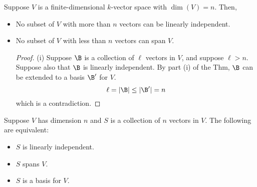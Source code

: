 \documentclass[a5paper]{article}
\begin{document}
\begin{corollary}
Suppose $V$ is a finite-dimensional $k$-vector space with $\dim(V)=n$. Then, 
\begin{itemize}
	\item No subset of $V$ with more than $n$ vectors can be linearly independent. 
	\item No subset of $V$ with less than $n$ vectors can span $V$. 
	\begin{proof}(i)
	Suppose $\B$ is a collection of $\ell$ vectors in $V$, and suppose $\ell>n$. Suppose also that $\B$ is linearly independent. By part (i) of the Thm, $\B$ can be extended to a basis $\B'$ for $V$. 
	$$\ell = |\B| \leq |\B'|=n $$
	which is a contradiction. 
	\end{proof}	 
\end{itemize}
\end{corollary}

\begin{corollary}
Suppose $V$ has dimension $n$ and $S$ is a collection of $n$ vectors in $V$. The following are equivalent:
\begin{itemize}
	\item $S$ is linearly independent.
	\item $S$ spans $V$.
	\item $S$ is a basis for $V$.
\end{itemize}
\end{corollary}
\end{document}
